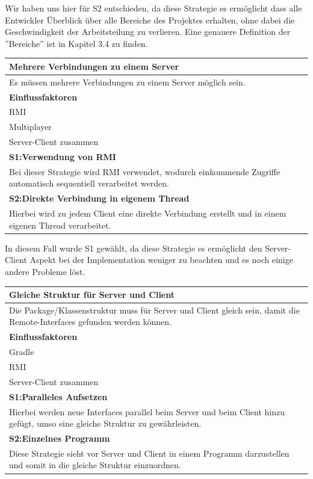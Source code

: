 \documentclass[fontsize=12pt,paper=a4,twoside]{scrartcl}
\begin{document}
Wir haben uns hier für S2 entschieden, da diese Strategie es ermöglicht dass alle Entwickler Überblick über alle Bereiche des Projektes erhalten, ohne dabei die Geschwindigkeit der Arbeitsteilung zu verlieren. Eine genauere Definition der ''Bereiche'' ist in Kapitel 3.4 zu finden.

\begin{tabular}{|p{15cm}|}
	\hline
	\bfseries{Mehrere Verbindungen zu einem Server}\\ \hline
	Es müssen mehrere Verbindungen zu einem Server möglich sein.\\ 
	\textbf{Einflussfaktoren}\\
	RMI\\ 
	Multiplayer\\ 
	Server-Client zusammen\\ \hline
	\textbf{S1:Verwendung von RMI}\\
	Bei dieser Strategie wird RMI verwendet, wodurch einkommende Zugriffe automatisch sequentiell verarbeitet werden.\\ \hline
	\textbf{S2:Direkte Verbindung in eigenem Thread}\\
	Hierbei wird zu jedem Client eine direkte Verbindung erstellt und in einem eigenen Thread verarbeitet.\\ \hline
\end{tabular} 

In diesem Fall wurde S1 gewählt, da diese Strategie es ermöglicht den Server-Client Aspekt bei der Implementation weniger zu beachten und es noch einige andere Probleme löst.

\begin{tabular}{|p{15cm}|}
	\hline
	\bfseries{Gleiche Struktur für Server und Client}\\ \hline
	Die Package/Klassenstruktur muss für Server und Client gleich sein, damit die Remote-Interfaces gefunden werden können.\\ 
	\textbf{Einflussfaktoren}\\
	Gradle\\ 
	RMI\\ 
	Server-Client zusammen\\ \hline
	\textbf{S1:Paralleles Aufsetzen}\\
	Hierbei werden neue Interfaces parallel beim Server und beim Client hinzu gefügt, umso eine gleiche Struktur zu gewährleisten.\\ \hline
	\textbf{S2:Einzelnes Programm}\\
	Diese Strategie sieht vor Server und Client in einem Programm darzustellen und somit in die gleiche Struktur einzuordnen.\\ \hline
\end{tabular} 
\end{document}
